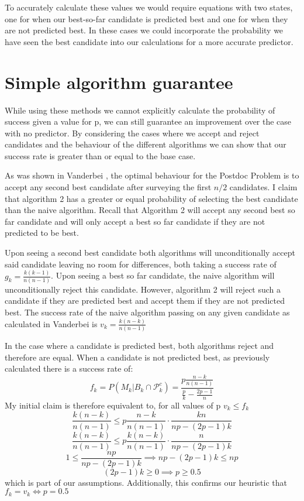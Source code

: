 \documentclass[a4paper,11pt]{article}
\begin{document}
To accurately calculate these values we would require equations with two states, one for when our best-so-far candidate is predicted best and one for when they are not predicted best. In these cases we could incorporate the probability we have seen the best candidate into our calculations for a more accurate predictor.

\section{Simple algorithm guarantee}

While using these methods we cannot explicitly calculate the probability of success given a value for p, we can still guarantee an improvement over the case with no predictor. By considering the cases where we accept and reject candidates and the behaviour of the different algorithms we can show that our success rate is greater than or equal to the base case.

As was shown in Vanderbei \cite{vanderbei2011postdoc}, the optimal behaviour for the Postdoc Problem is to accept any second best candidate after surveying the first $n/2$ candidates. I claim that algorithm 2 has a greater or equal probability of selecting the best candidate than the naive algorithm. Recall that Algorithm 2 will accept any second best so far candidate and will only accept a best so far candidate if they are not predicted to be best. 

Upon seeing a second best candidate both algorithms will unconditionally accept said candidate leaving no room for differences, both taking a success rate of $g_k = \frac{k(k-1)}{n(n-1)}$. Upon seeing a best so far candidate, the naive algorithm will unconditionally reject this candidate. However, algorithm 2 will reject such a candidate if they are predicted best and accept them if they are not predicted best. The success rate of the naive algorithm passing on any given candidate as calculated in Vanderbei is $v_k = \frac{k(n-k)}{n(n-1)}$

In the case where a candidate is predicted best, both algorithms reject and therefore are equal. When a candidate is not predicted best, as previously calculated there is a success rate of:
$$
f_k=P(M_k| B_k\cap \mathcal{P}^c_k ) = \frac{p\frac{n-k}{n(n-1)}}{\frac{p}{k} - \frac{2p-1}{n}}
$$
My initial claim is therefore equivalent to, for all values of p $v_k \le f_k$ 
$$
\frac{k(n-k)}{n(n-1)} \le p\frac{n-k}{n(n-1)}\cdot\frac{kn}{np-(2p-1)k} 
$$
$$
\frac{k(n-k)}{n(n-1)} \le p\frac{k(n-k)}{n(n-1)}\cdot\frac{n}{np-(2p-1)k} 
$$
$$
1\le \frac{np}{np-(2p-1)k}  \implies np-(2p-1)k \le np
$$
$$
(2p-1)k \ge 0 \implies p \ge 0.5
$$
which is part of our assumptions. Additionally, this confirms our heuristic that $f_k = v_k \iff p =0.5$
\end{document}
